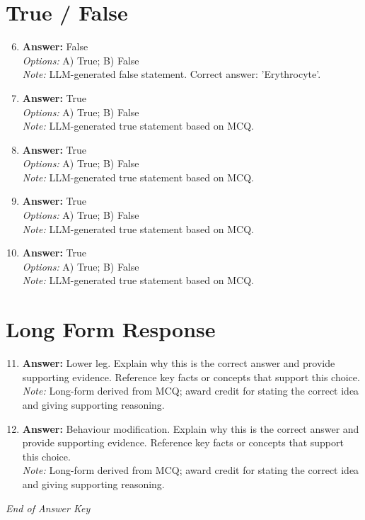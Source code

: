 \documentclass[12pt]{article}
\begin{document}
\section*{True / False}
\begin{enumerate}[label=\arabic*.]
\setcounter{enumi}{5}
\item \textbf{Answer:} False
\\ \textit{Options:} A) True; B) False
\\ \textit{Note:} LLM-generated false statement. Correct answer: 'Erythrocyte'.
\item \textbf{Answer:} True
\\ \textit{Options:} A) True; B) False
\\ \textit{Note:} LLM-generated true statement based on MCQ.
\item \textbf{Answer:} True
\\ \textit{Options:} A) True; B) False
\\ \textit{Note:} LLM-generated true statement based on MCQ.
\item \textbf{Answer:} True
\\ \textit{Options:} A) True; B) False
\\ \textit{Note:} LLM-generated true statement based on MCQ.
\item \textbf{Answer:} True
\\ \textit{Options:} A) True; B) False
\\ \textit{Note:} LLM-generated true statement based on MCQ.
\end{enumerate}

\section*{Long Form Response}
\begin{enumerate}[label=\arabic*.]
\setcounter{enumi}{10}
\item \textbf{Answer:} Lower leg. Explain why this is the correct answer and provide supporting evidence. Reference key facts or concepts that support this choice.
\\ \textit{Note:} Long-form derived from MCQ; award credit for stating the correct idea and giving supporting reasoning.
\item \textbf{Answer:} Behaviour modification. Explain why this is the correct answer and provide supporting evidence. Reference key facts or concepts that support this choice.
\\ \textit{Note:} Long-form derived from MCQ; award credit for stating the correct idea and giving supporting reasoning.
\end{enumerate}

\vfill
\noindent\textit{End of Answer Key}
\end{document}
